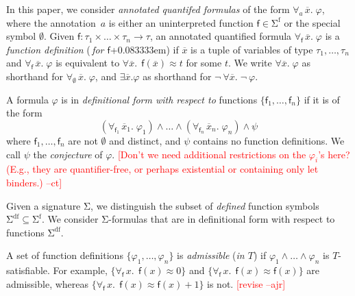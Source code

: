 \documentclass[runningheads,a4paper]{llncs}
\newcommand{\con}[1]{\mathsf{#1}}
\renewcommand\vec[1]{\overline{#1}}
\let\oldSigma=\Sigma
\def\Sigma{\mathrm{\oldSigma}}
\let\oldneg=\neg
\def\neg{\oldneg\:}
\newcommand{\teq}{\approx}
\newcommand{\sfuns}[1]{#1^\mathrm{f}}
\newcommand{\sfundefs}[1]{#1^\mathrm{df}}
\newcommand{\forallf}[1]{\forall_{\!#1\:}}
\newcommand{\fnull}{\emptyset}
\newcommand{\rem}[1]{\textcolor{red}{[#1]}}
\newcommand{\ajr}[1]{\rem{#1 --ajr}}
\newcommand{\ct}[1]{\rem{#1 --ct}}
\newcommand{\vthinspace}{\kern+0.083333em}
\begin{document}
In this paper, we consider \emph{annotated quantifed formulas} of the form
$\forallf{a} \vec x.\; \varphi$, where the annotation~$a$ is either
an uninterpreted function $\con{f} \in \sfuns{\Sigma}$ or the special symbol
$\fnull$.
Given $\con{f} : \tau_1 \times \ldots \times \tau_n \rightarrow \tau$,
an annotated
quantified formula $\forallf{\con{f}} \vec x.\; \varphi$ is a \emph{function definition}
(\,\emph{for $\con{f}$}\vthinspace) if $\vec x$ is a tuple of variables of type
$\tau_1, \ldots, \tau_n$ and $\forallf{\con{f}} \vec x.\; \varphi$ is equivalent to
$\forall \vec x.\;\, \con{f}( \vec x ) \teq t$ for some $t$. We write $\forall \vec
x.\; \varphi$ as shorthand for $\forallf{\fnull} \vec x.\; \varphi$, and $\exists
\vec x. \varphi$ as shorthand for $\neg \forall \vec x.\; \neg \varphi$.

\begin{definition}%
\rm
A formula $\varphi$ is in \emph{definitional form with respect to} functions $\{
\con{f}_1, \ldots, \con{f}_n \}$ if it is of the form
%
%
\begin{equation} \label{eq:wdf}
(\forallf{\con{f}_1} \vec x_1.\; \varphi_1) \wedge \ldots \wedge (\forallf{\con{f}_n} \vec x_n.\; \varphi_n) \wedge \psi
\end{equation}
%
where $\con{f}_1, \ldots, \con{f}_n$ are not $\fnull$ and distinct, 
and $\psi$ contains no function definitions.
We call $\psi$ the \emph{conjecture} of $\varphi$.
\ct{Don't we need additional restrictions on the $\varphi_i$'s here?
(E.g., they are quantifier-free, or perhaps existential or containing only let binders.)}
\end{definition}

Given a signature $\Sigma$,
we distinguish the subset of \emph{defined} function symbols $\sfundefs{\Sigma}
\subseteq \sfuns{\Sigma}$.
We consider $\Sigma$-formulas that are in definitional form with respect to
functions $\sfundefs{\Sigma}$.

A set of function definitions $\{ \varphi_1, \ldots, \varphi_n \}$ 
is \emph{admissible} (\emph{in $T$}) if $\varphi_1 \wedge \ldots \wedge \varphi_n$ is $T$-satisfiable.
For example, $\{ \forallf{\con{f}} x.\;\, \con{f}( x ) \teq 0 \}$
and $\{ \forallf{\con{f}} x.\;\, \con{f}( x ) \teq \con{f}( x ) \}$ are admissible,
whereas $\{ \forallf{\con{f}} x.\;\, \con{f}( x ) \teq \con{f}( x ) + 1 \}$ is not.
\ajr{revise}
\end{document}
